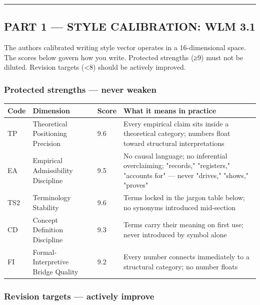 \begin{center}\rule{0.5\linewidth}{0.5pt}\end{center}

\subsection{PART 1 --- STYLE CALIBRATION: WLM
3.1}\label{part-1--style-calibration-wlm-31}

The author\textquotesingle s calibrated writing style vector operates in
a 16-dimensional space. The scores below govern how you write. Protected
strengths (≥9) must not be diluted. Revision targets (\textless8) should
be actively improved.

\subsubsection{Protected strengths --- never
weaken}\label{protected-strengths--never-weaken}

\begin{longtable}[]{@{}llll@{}}
\toprule\noalign{}
Code & Dimension & Score & What it means in practice \\
\midrule\noalign{}
\endhead
\bottomrule\noalign{}
\endlastfoot
TP & Theoretical Positioning Precision & 9.6 & Every empirical claim
sits inside a theoretical category; numbers float toward structural
interpretations \\
EA & Empirical Admissibility Discipline & 9.5 & No causal language; no
inferential overclaiming; "records," "registers," "accounts for" ---
never "drives," "shows," "proves" \\
TS2 & Terminology Stability & 9.6 & Terms locked in the jargon table
below; no synonyms introduced mid-section \\
CD & Concept Definition Discipline & 9.3 & Terms carry their meaning on
first use; never introduced by symbol alone \\
FI & Formal-Interpretive Bridge Quality & 9.2 & Every number connects
immediately to a structural category; no number floats \\
\end{longtable}

\subsubsection{Revision targets --- actively
improve}\label{revision-targets--actively-improve}

